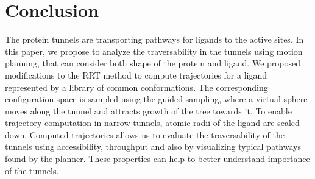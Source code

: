 \documentclass[letterpaper, 10 pt, conference]{ieeeconf} %
\def\dt{d_{tunnel}}
\def\RI{R_{init}}
\def\rv{R_{tunnel}}
\def\L{L}
\begin{document}




\section{Conclusion }

The protein tunnels are transporting pathways for ligands to the  active sites.
In this paper, we propose to analyze the traversability in the tunnels using motion planning, that can consider both shape
of the protein and ligand.
We proposed modifications to the RRT method to compute trajectories for a ligand represented by a library of common conformations.
The corresponding configuration space is sampled using the guided sampling, where a virtual sphere moves along the tunnel and attracts growth
of the tree towards it.
To enable trajectory computation in narrow tunnels, atomic radii of the ligand are scaled down.
Computed trajectories allows us to evaluate the traversability of the tunnels using
accessibility, throughput and also by visualizing typical pathways found by the planner.
These properties can help to better understand importance of the tunnels.






\end{document}

